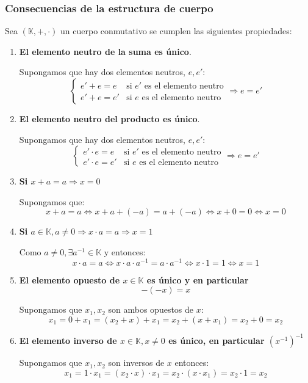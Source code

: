 \documentclass[10pt,a4paper,openright]{book}
\theoremstyle{break}
\begin{document}
\subsubsection{Consecuencias de la estructura de cuerpo}
Sea $(\mathbb K, +, \cdot)$ un cuerpo conmutativo se cumplen las siguientes propiedades:
\begin{enumerate}
\item \textbf{El elemento neutro de la suma es único}.\par
 Supongamos que hay dos elementos neutros, $e, e'$:
 \begin{equation*}
 \begin{cases}
 e'+e=e & \mbox{si } e'\mbox{ es el elemento neutro} \\
 e'+e=e' & \mbox{si } e \mbox{ es el elemento neutro}
 \end{cases}
 \Rightarrow e=e'
 \end{equation*}
\item \textbf{El elemento neutro del producto es único}.\par
 Supongamos que hay dos elementos neutros, $e, e'$:
 \begin{equation*}
 \begin{cases}
 e'\cdot e=e & \mbox{si } e'\mbox{ es el elemento neutro} \\
 e'\cdot e=e' & \mbox{si } e \mbox{ es el elemento neutro}
 \end{cases}
 \Rightarrow e=e'
 \end{equation*}
 
\item \textbf{Si $x+a=a\Rightarrow x=0$}\par
 Supongamos que:
 $$x+a=a\Leftrightarrow x+a+(-a)=a+(-a)\Leftrightarrow x+0=0 \Leftrightarrow x=0$$
 
\item \textbf{Si $a\in \mathbb K , a\neq 0\Rightarrow x\cdot a=a\Rightarrow x=1$}\par
 Como $a\neq 0, \exists a^{-1}\in \mathbb K$ y entonces:
$$x\cdot a=a \Leftrightarrow x\cdot a \cdot a^{-1}=a\cdot a^{-1}\Leftrightarrow x\cdot 1=1 \Leftrightarrow x=1$$

\item \textbf{El elemento opuesto de $x\in \mathbb K$ es único y en particular $$-(-x)=x$$}\par
 Supongamos que $x_1, x_2$ son ambos opuestos de $x$:
 $$x_1=0+x_1=(x_2+x)+x_1=x_2+(x+x_1)=x_2+0=x_2$$

\item \textbf{El elemento inverso de $x\in \mathbb K , x\neq 0$ es único, en particular $(x^{-1})^{-1}$}\par
 Supongamos que $x_1, x_2$ son inversos de $x$ entonces:
 $$x_1=1\cdot x_1=(x_2\cdot x)\cdot x_1=x_2\cdot (x\cdot x_1)=x_2\cdot 1=x_2$$
 

\end{enumerate}
\end{document}
